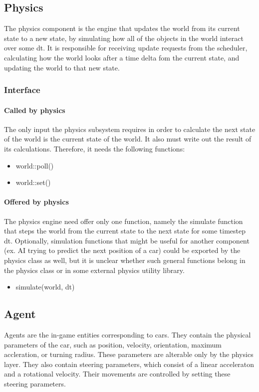 \documentclass[12pt]{article}
\begin{document}
\subsection{Physics}
The physics component is the engine that updates the world from its current
state to a new state, by simulating how all of the objects in the world
interact over some dt. It is responsible for receiving update requests from the
scheduler, calculating how the world looks after a time delta fom the current
state, and updating the world to that new state.
\subsubsection{Interface}
\paragraph{Called by physics}
The only input the physics subsystem requires in order to calculate the next
state of the world is the current state of the world. It also must write out
the result of its calculations. Therefore, it needs the following functions:
\begin{itemize}
\item world::poll()
\item world::set()
\end{itemize}
\paragraph{Offered by physics}
The physics engine need offer only one function, namely the simulate function
that steps the world from the current state to the next state for some timestep
dt. Optionally, simulation functions that might be useful for another component
(ex. AI trying to predict the next position of a car) could be exported by
the physics class as well, but it is unclear whether such general functions
belong in the physics class or in some external physics utility library.

\begin{itemize}
\item simulate(world, dt)
\end{itemize}

\subsection{Agent}
Agents are the in-game entities corresponding to cars. They contain the
physical parameters of the car, such as position, velocity, orientation, maximum
accleration, or turning radius. These parameters are alterable only by the
physics layer. They also contain steering parameters, which consist of a linear
acceleraton and a rotational velocity. Their movements are controlled by setting
these steering parameters.
\end{document}
